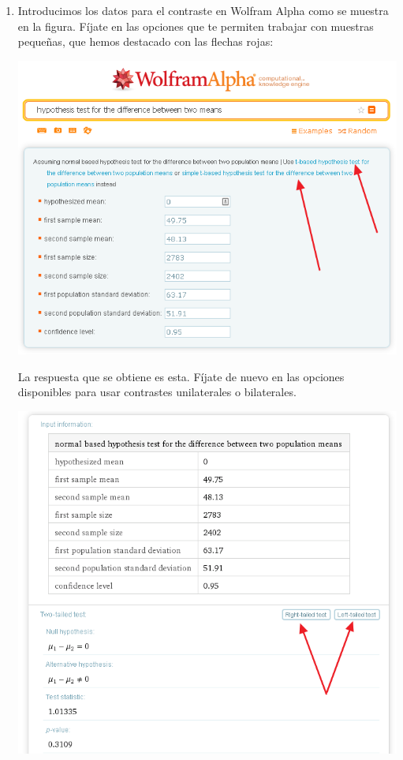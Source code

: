 \documentclass[10pt,a4paper]{article}\usepackage[]{graphicx}\usepackage[]{color}
\newcounter {cont01}
\begin{document}
{\begin{enumerate}
  \item Introducimos los datos para el contraste en Wolfram Alpha como se muestra en la figura. Fíjate en las opciones que te permiten trabajar con muestras pequeñas, que hemos destacado con las flechas rojas:
    \begin{center}
    \includegraphics[width=14cm]{../fig/Tut09-10.png}
    \end{center}
    La respuesta que se obtiene es esta. Fíjate de nuevo en las opciones disponibles para usar contrastes unilaterales o bilaterales.
    \begin{center}
    \includegraphics[width=14cm]{../fig/Tut09-11.png}
    \end{center}


\end{enumerate}}
\end{document}
